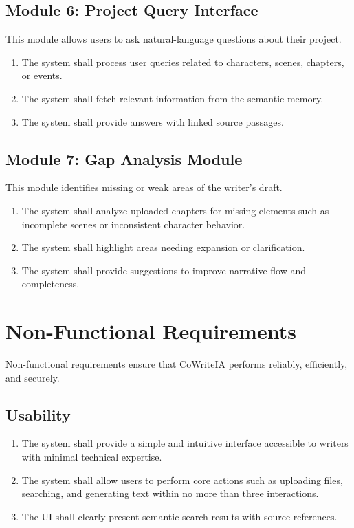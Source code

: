 \subsection{Module 6: Project Query Interface}
This module allows users to ask natural-language questions about their project.
\begin{enumerate}
    \item The system shall process user queries related to characters, scenes, chapters, or events.
    \item The system shall fetch relevant information from the semantic memory.
    \item The system shall provide answers with linked source passages.
\end{enumerate}

\subsection{Module 7: Gap Analysis Module}
This module identifies missing or weak areas of the writer’s draft.
\begin{enumerate}
    \item The system shall analyze uploaded chapters for missing elements such as incomplete scenes or inconsistent character behavior.
    \item The system shall highlight areas needing expansion or clarification.
    \item The system shall provide suggestions to improve narrative flow and completeness.
\end{enumerate}

\section{Non-Functional Requirements}
Non-functional requirements ensure that CoWriteIA performs reliably, efficiently, and securely.

\subsection{Usability}
\begin{enumerate}
    \item The system shall provide a simple and intuitive interface accessible to writers with minimal technical expertise.
    \item The system shall allow users to perform core actions such as uploading files, searching, and generating text within no more than three interactions.
    \item The UI shall clearly present semantic search results with source references.
\end{enumerate}

